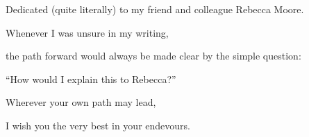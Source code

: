 Dedicated (quite literally) to my friend and colleague Rebecca Moore.

Whenever I was unsure in my writing,

the path forward would always be made clear by the simple question:

``How would I explain this to Rebecca?''

Wherever your own path may lead,

I wish you the very best in your endevours.
